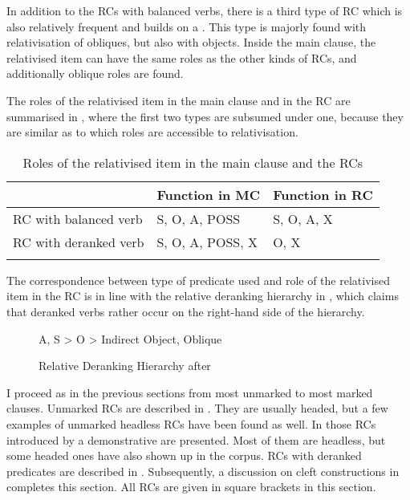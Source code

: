 In addition to the RCs with balanced verbs, there is a third type of RC which is also relatively frequent and builds on a . This type is majorly found with relativisation of obliques, but also with objects. Inside the main clause, the relativised item can have the same roles as the other kinds of RCs, and additionally oblique roles are found.

The roles of the relativised item in the main clause and in the RC are summarised in  , where the first two types are subsumed under one, because they are similar as to which roles are accessible to relativisation.

\begin{table}
\begin{tabularx}{.8\textwidth}{QQl}
\lsptoprule
& Function in MC & Function in RC\\
\midrule
RC with balanced verb & S, O, A, POSS & S, O, A, X\\
RC with deranked verb & S, O, A, POSS, X & O, X\\
\lspbottomrule
\end{tabularx}

\caption{Roles of the relativised item in the main clause and the RCs}
\label{tab:RelativeClausesRoles}
\end{table}


The correspondence between type of predicate used and role of the relativised item in the RC is in line with the relative deranking hierarchy in , which claims that deranked verbs rather occur on the right-hand side of the hierarchy.

\begin{figure}

A, S > O > Indirect Object, Oblique

\caption{Relative Deranking Hierarchy after \citet[203]{Cristofaro2003}}
\label{fig:RelativDeranking}
\end{figure}

I proceed as in the previous sections from most unmarked to most marked clauses. Unmarked RCs are described in . They are usually headed, but a few examples of unmarked headless RCs have been found as well. In  those RCs introduced by a demonstrative are presented. Most of them are headless, but some headed ones have also shown up in the corpus. RCs with deranked predicates are described in . 
Subsequently, a discussion on cleft constructions in  completes this section. All RCs are given in square brackets in this section.

